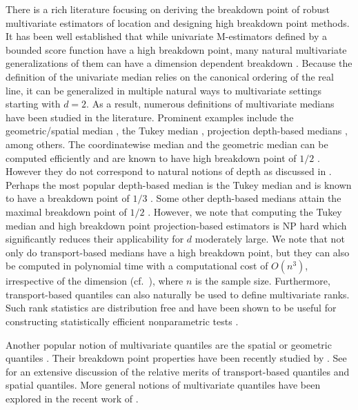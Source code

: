 \documentclass[11pt]{article}
\theoremstyle{plain}
\theoremstyle{definition}
\begin{document}
There is a rich literature focusing on deriving the breakdown point of robust multivariate estimators of location and designing high breakdown point methods. It has been well established that while univariate M-estimators defined by a bounded score function have a high breakdown point, many natural multivariate generalizations of them can have a dimension dependent breakdown \cite{maronna1976,donoho:huber1983,huber1984,tyler1994,maronna:yohai1995,kent:tyler1996}. 
Because the definition of the univariate median relies on the canonical ordering of the real line, it can be generalized in multiple natural ways to multivariate settings starting with $d=2$. As a result, numerous definitions of multivariate medians have been studied in the literature. Prominent examples include the geometric/spatial median \cite{koltchinskii1994,chaudhuri1996,minsker2015,minsker:strawn2024}, the Tukey median \cite{Tukey.1975,donoho:gasko1992,chen:gao:ren2018}, projection depth-based medians \cite{adrover:yohai2002,zuo2003,ramsay:durocher:leblanc2021,depersin:lecue2023}, among others. The coordinatewise median and the geometric median  \cite{koltchinskii1994,chaudhuri1996,minsker2015,minsker:strawn2024} can be computed efficiently and are known to have high breakdown point of $1/2$ \cite{lopuhaa:rousseeuw1991}. However they do not correspond to natural notions of depth  as discussed in \cite{zuo:serfling2000,ChernozhukovEtAl.17.AOS}.  Perhaps the most popular depth-based median is the Tukey median and is known to have a breakdown point of $1/3$ \cite{donoho:gasko1992}. Some other depth-based medians attain the maximal breakdown point of $1/2$ \cite{tyler1994,zuo2003}. However, we note that computing the Tukey median and high breakdown point projection-based estimators is NP hard \cite{bernholt2006} which significantly reduces their applicability for  $d$ moderately large. We note that not only do  transport-based medians have a high breakdown point, but they can also be computed in polynomial time with a computational cost of $O(n^3)$, irrespective of the dimension (cf.\  \cite[ {Remark~3.3}]{CuturiPeyre.19}),  where $n$ is the sample size. 
 Furthermore, transport-based quantiles can also naturally be used to define multivariate ranks. Such rank statistics are distribution free and have been shown to be useful for constructing statistically efficient nonparametric tests 
\cite{HallinDelBarrioCuestaAlbertosMatran.21, DebSen.19, Shietal.2022,deb:bhattacharya:sen2025}.

{Another popular notion of multivariate quantiles are the spatial or geometric quantiles \cite{chaudhuri1996}. Their breakdown point properties have been recently studied by \cite{konen:paindaveine2023,konen:paindaveine2025}. See \cite{hallin:konen2024} for an extensive discussion of the relative merits of transport-based quantiles and spatial quantiles. More general notions of multivariate quantiles have been explored in the recent work of  \cite{konen:paindaveine2022,konen2025}.}
\end{document}
